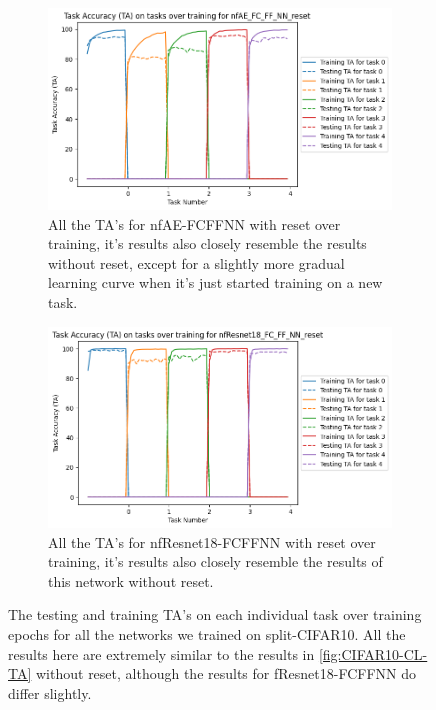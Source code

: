 \begin{figure}[ht]
 \begin{subfigure}[t]{0.4\textwidth}
    \includegraphics[width=\linewidth]{images/CIFAR10_CL/nfAE_FC_FF_NN_reset_TA_task.png}
    \caption{All the TA's for nfAE-FCFFNN with reset over training, it's results also closely resemble the results without reset, except for a slightly more gradual learning curve when it's just started training on a new task.}
 \end{subfigure}
 \quad
  \begin{subfigure}[t]{0.4\textwidth}
    \includegraphics[width=\linewidth]{images/CIFAR10_CL/nfResnet18_FC_FF_NN_reset_TA_task.png}
    \caption{All the TA's for nfResnet18-FCFFNN with reset over training, it's results also closely resemble the results of this network without reset.}
 \end{subfigure}
  
  \caption{The testing and training TA's on each individual task over training epochs for all the networks we trained on split-CIFAR10. All the results here are extremely similar to the results in \cref{fig:CIFAR10-CL-TA} without reset, although the results for fResnet18-FCFFNN do differ slightly.}
  \label{fig:CIFAR10-CL-TA-reset}
\end{figure}